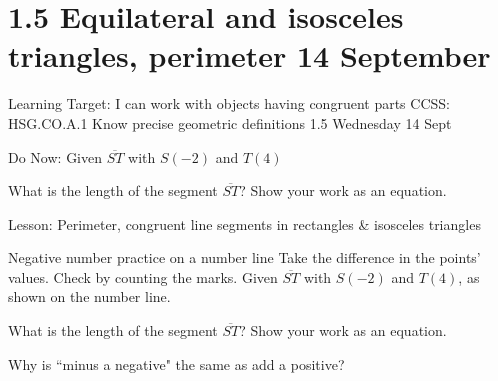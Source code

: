 \section{1.5 Equilateral and isosceles triangles, perimeter \hfill 14 September}
\begin{frame}{Learning Target: I can work with objects having congruent parts}
  {CCSS: HSG.CO.A.1 Know precise geometric definitions  \hfill \alert{1.5 Wednesday 14 Sept}}
    \begin{block}{Do Now: Given $\overline{ST}$ with $S(-2)$ and $T(4)$}
      \begin{center}
      \end{center}
    What is the length of the segment $\overline{ST}$? Show your work as an equation.
    \end{block} \vspace{2cm}
    Lesson: Perimeter, congruent line segments in rectangles \& isosceles triangles
  \end{frame}

\begin{frame}{Negative number practice on a number line}
  {Take the difference in the points' values. Check by counting the marks.}
  Given $\overline{ST}$ with $S(-2)$ and $T(4)$, as shown on the number line.
  \begin{center}
  \end{center}
  What is the length of the segment $\overline{ST}$? Show your work as an equation.\par \vspace{3cm}
  Why is ``minus a negative" the same as add a positive? \vspace{2cm}  
\end{frame}

